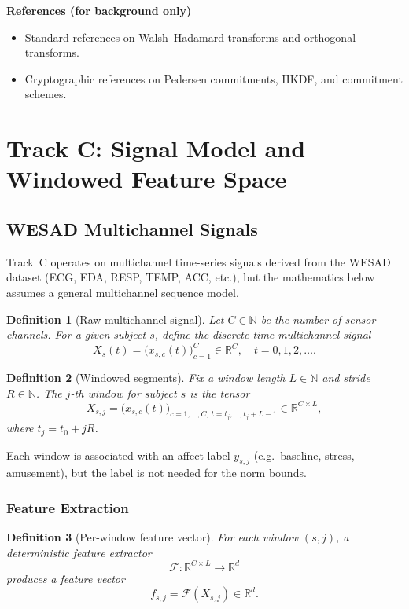 \documentclass[11pt]{article}
\newtheorem{definition}{Definition}[section]
\newcommand{\N}{\mathbb{N}}
\newcommand{\R}{\mathbb{R}}
\begin{document}
\vspace{1em}
\noindent\textbf{References (for background only)}
\begin{itemize}
  \item Standard references on Walsh--Hadamard transforms and orthogonal transforms.\cite{WHTOverview,WHTOrthogonal}
  \item Cryptographic references on Pedersen commitments, HKDF, and commitment schemes.\cite{PedersenZKDocs,PedersenRareSkills,CommitmentSchemeWiki,HKDFWiki,GopherHKDF}
\end{itemize}


\section{Track C: Signal Model and Windowed Feature Space}

\subsection{WESAD Multichannel Signals}

Track~C operates on multichannel time-series signals derived from the WESAD dataset (ECG, EDA, RESP, TEMP, ACC, etc.), but the mathematics below assumes a general multichannel sequence model.

\begin{definition}[Raw multichannel signal]
Let \(C \in \N\) be the number of sensor channels.
For a given subject \(s\), define the discrete-time multichannel signal
\[
  X_s(t) = \bigl(x_{s,c}(t)\bigr)_{c=1}^C \in \R^C, \quad t = 0,1,2,\dots .
\]
\end{definition}

\begin{definition}[Windowed segments]
Fix a window length \(L \in \N\) and stride \(R \in \N\).
The \(j\)-th window for subject \(s\) is the tensor
\[
  X_{s,j} = \bigl(x_{s,c}(t)\bigr)_{c=1,\dots,C;\, t = t_j,\dots,t_j+L-1}
  \in \R^{C \times L},
\]
where \(t_j = t_0 + jR\).
\end{definition}

Each window is associated with an affect label \(y_{s,j}\) (e.g.~baseline, stress, amusement), but the label is not needed for the norm bounds.

\subsubsection{Feature Extraction}

\begin{definition}[Per-window feature vector]
For each window \((s,j)\), a deterministic feature extractor
\[
  \mathcal{F} : \R^{C \times L} \to \R^d
\]
produces a feature vector
\[
  f_{s,j} = \mathcal{F}(X_{s,j}) \in \R^d.
\]
\end{definition}
\end{document}

